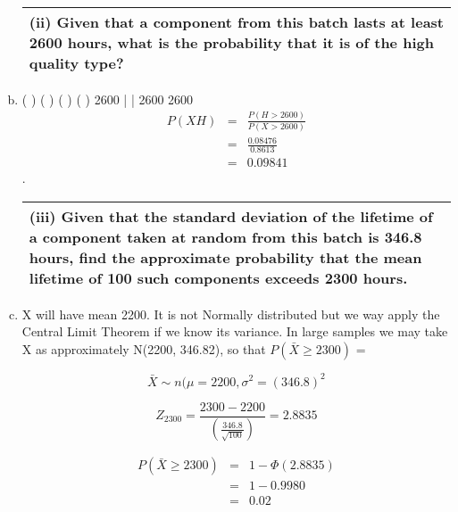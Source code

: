 \documentclass[a4paper,12pt]{article}
\begin{document}
\begin{enumerate}[(a)]
   
\newpage
\begin{table}[ht!]
 \centering
 \begin{tabular}{|p{15cm}|}
 \hline
\noindent (ii) Given that a component from this batch lasts at least 2600 hours,
what is the probability that it is of the high quality type?
\\ \hline
  \end{tabular}
\end{table}
\item  ( ) ( ) ( )
( )
2600 |  | 2600 
2600 
\begin{eqnarray*}
P (X  H) &=& \frac{P(H>2600)}{P(X>2600)}\\
&=& \frac{0.08476}{0.8613}\\
&=& 0.09841
\end{eqnarray*}.


\newpage
\begin{table}[ht!]
 \centering
 \begin{tabular}{|p{15cm}|}
 \hline
\noindent (iii) Given that the standard deviation of the lifetime of a component
taken at random from this batch is 346.8 hours, find the
approximate probability that the mean lifetime of 100 such
components exceeds 2300 hours.
\\ \hline
  \end{tabular}
\end{table}
\item X will have mean 2200. It is not Normally distributed but we way
apply the Central Limit Theorem if we know its variance. In large samples we
may take X as approximately N(2200, 346.82), so that $P(\bar{X}\geq 2300)$ = 
  
\[\bar{X} \sim n(\mu = 2200, \sigma^2 = (346.8)^2\]
   
 \[Z_{2300}  =   \frac{2300-2200}{   \left(\frac{346.8}{\sqrt{100}} \right)} = 2.8835\]



\begin{eqnarray*} 
P(\bar{X}\geq 2300) &=& 1- \Phi(2.8835)\\  &=& 1- 0.9980 \\&=& 0.02
\end{eqnarray*}

\end{enumerate}

  

  
\end{document}

